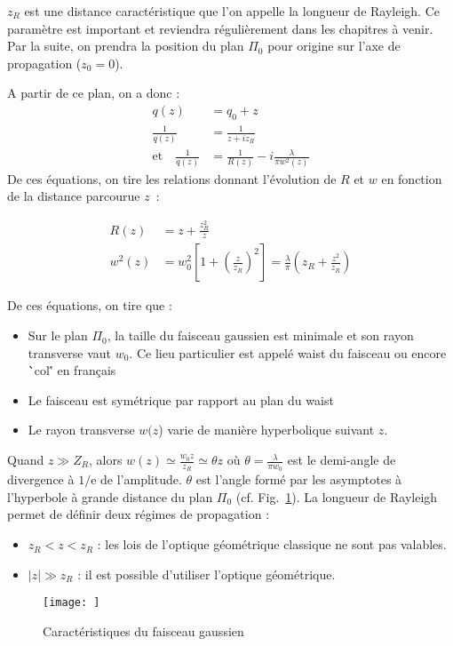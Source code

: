 \documentclass[a4paper]{book}
\begin{document}
$z_R$ est une distance caractéristique que l'on appelle la longueur de Rayleigh. Ce paramètre est important et reviendra régulièrement dans les chapitres à venir.
Par la suite, on prendra la position du plan $\Pi_0$ pour origine sur l'axe de propagation ($z_0=0$).

A partir de ce plan, on a donc :
\begin{align}
    q(z) &= q_0+z\\
    \frac{1}{q(z)}&=\frac{1}{z+iz_R}\\
    \textrm{et} \quad \frac{1}{q(z)}&=\frac{1}{R(z)}-i\frac{\lambda}{\pi w^2(z)}
\end{align}
De ces équations, on tire les relations donnant l'évolution de $R$ et $w$ en fonction de la distance parcourue $z$~:

\begin{align}
  R(z) &= z + \frac{z_R^2}{z}\\
  w^2(z)&= w_0^2\left[1+\left(\frac{z}{z_R}\right)^2\right]  = \frac{\lambda}{\pi}\left(z_R+\frac{z^2}{z_R}\right)
\end{align}

De ces équations, on tire que :
\begin{itemize}
    \item Sur le plan $\Pi_0$, la taille du faisceau gaussien est minimale et son rayon transverse vaut $w_0$. Ce lieu particulier est appelé waist du faisceau ou encore \``col\'' en français
    \item Le faisceau est symétrique par rapport au plan du waist
    \item Le rayon transverse $w(z$) varie de manière hyperbolique suivant $z$.
\end{itemize}

Quand $z\gg Z_R$, alors $w(z)\simeq\frac{w_0z}{z_R}\simeq \theta z$ où $\theta = \frac{\lambda}{\pi w_0}$ est le demi-angle de divergence à $1/$e de
l'amplitude. $\theta$ est l'angle formé par les asymptotes à l'hyperbole à grande
distance du plan $\Pi_0$ (cf. Fig.~\ref{fig:carac_gauss}).
La longueur de Rayleigh permet de définir deux régimes de propagation :
\begin{itemize}
    \item $z_R < z < z_R$ : les lois de l'optique géométrique classique ne sont pas valables.
    \item $|z|\gg z_R$ : il est possible d'utiliser l'optique géométrique.
\end{itemize}


\begin{figure}[!htbp]
\begin{center}
\texttt{[image: ]}
\end{center}
\caption{Caractéristiques du faisceau gaussien}
\label{fig:carac_gauss}
\end{figure}
\end{document}

